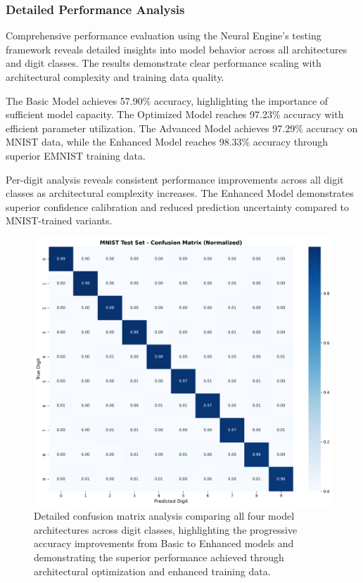 \documentclass[11pt,a4paper]{report}
\begin{document}
\subsubsection{Detailed Performance Analysis}

Comprehensive performance evaluation using the Neural Engine's testing framework reveals detailed insights into model behavior across all architectures and digit classes. The results demonstrate clear performance scaling with architectural complexity and training data quality.

The Basic Model achieves 57.90\% accuracy, highlighting the importance of sufficient model capacity. The Optimized Model reaches 97.23\% accuracy with efficient parameter utilization. The Advanced Model achieves 97.29\% accuracy on MNIST data, while the Enhanced Model reaches 98.33\% accuracy through superior EMNIST training data.

Per-digit analysis reveals consistent performance improvements across all digit classes as architectural complexity increases. The Enhanced Model demonstrates superior confidence calibration and reduced prediction uncertainty compared to MNIST-trained variants.

\begin{figure}[H]
\centering
\includegraphics[width=\textwidth]{confusion_matrix.png}
\caption{Detailed confusion matrix analysis comparing all four model architectures across digit classes, highlighting the progressive accuracy improvements from Basic to Enhanced models and demonstrating the superior performance achieved through architectural optimization and enhanced training data.}
\label{fig:digit_confusion}
\end{figure}
\end{document}
